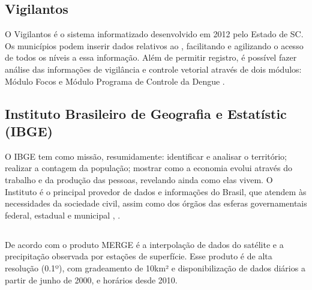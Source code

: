 \subsection{Vigilantos}

O Vigilantos é o sistema informatizado  desenvolvido em 2012 pelo Estado de \acrlong{SC}. Os municípios podem inserir dados relativos ao , facilitando e agilizando o acesso de todos os níveis a essa informação. Além de permitir registro, é possível fazer análise das informações de vigilância e controle vetorial através de dois módulos: Módulo Focos e Módulo Programa de Controle da Dengue \cite{Vigilantos}.

\subsection{Instituto Brasileiro de Geografia e Estatístic (IBGE)}

O \acrshort{IBGE} tem como missão, resumidamente: identificar e analisar o território; realizar a contagem da população; mostrar como a economia evolui através do trabalho e da produção das pessoas, revelando ainda como elas vivem.  O Instituto é o principal provedor de dados e informações do Brasil, que atendem às necessidades da sociedade civil, assim como dos órgãos das esferas governamentais federal, estadual e municipal \cite{IBGE22}, \cite{IBGE23prev}.



\subsection{}

\indent De acordo com  o produto \acrshort{MERGE} é a interpolação de dados do satélite  e a precipitação observada por estações de superfície. Esse produto é de alta resolução (0.1º), com gradeamento de 10km² e disponibilização de dados diários a partir de junho de 2000, e horários desde 2010.

